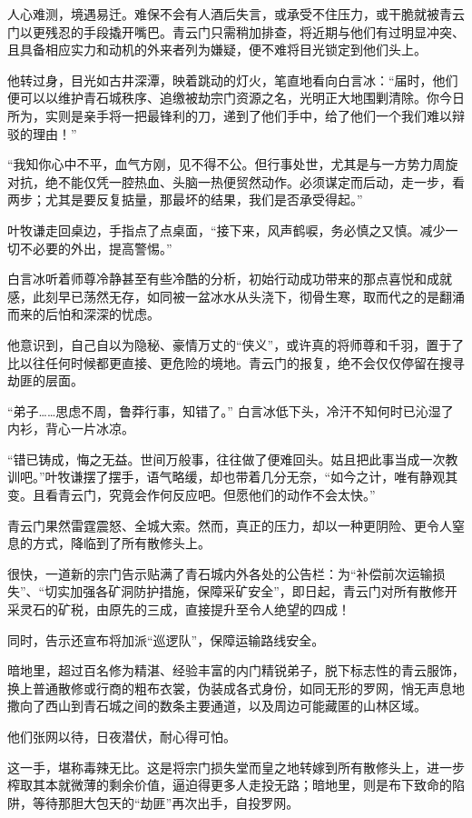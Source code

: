 人心难测，境遇易迁。难保不会有人酒后失言，或承受不住压力，或干脆就被青云门以更残忍的手段撬开嘴巴。青云门只需稍加排查，将近期与他们有过明显冲突、且具备相应实力和动机的外来者列为嫌疑，便不难将目光锁定到他们头上。

他转过身，目光如古井深潭，映着跳动的灯火，笔直地看向白言冰：“届时，他们便可以以维护青石城秩序、追缴被劫宗门资源之名，光明正大地围剿清除。你今日所为，实则是亲手将一把最锋利的刀，递到了他们手中，给了他们一个我们难以辩驳的理由！”

“我知你心中不平，血气方刚，见不得不公。但行事处世，尤其是与一方势力周旋对抗，绝不能仅凭一腔热血、头脑一热便贸然动作。必须谋定而后动，走一步，看两步；尤其是要反复掂量，那最坏的结果，我们是否承受得起。”

叶牧谦走回桌边，手指点了点桌面，“接下来，风声鹤唳，务必慎之又慎。减少一切不必要的外出，提高警惕。”

白言冰听着师尊冷静甚至有些冷酷的分析，初始行动成功带来的那点喜悦和成就感，此刻早已荡然无存，如同被一盆冰水从头浇下，彻骨生寒，取而代之的是翻涌而来的后怕和深深的忧虑。

他意识到，自己自以为隐秘、豪情万丈的“侠义”，或许真的将师尊和千羽，置于了比以往任何时候都更直接、更危险的境地。青云门的报复，绝不会仅仅停留在搜寻劫匪的层面。

“弟子……思虑不周，鲁莽行事，知错了。” 白言冰低下头，冷汗不知何时已沁湿了内衫，背心一片冰凉。

“错已铸成，悔之无益。世间万般事，往往做了便难回头。姑且把此事当成一次教训吧。”叶牧谦摆了摆手，语气略缓，却也带着几分无奈，“如今之计，唯有静观其变。且看青云门，究竟会作何反应吧。但愿他们的动作不会太快。”

\vspace{2em}

青云门果然雷霆震怒、全城大索。然而，真正的压力，却以一种更阴险、更令人窒息的方式，降临到了所有散修头上。

很快，一道新的宗门告示贴满了青石城内外各处的公告栏：为“补偿前次运输损失”、“切实加强各矿洞防护措施，保障采矿安全”，即日起，青云门对所有散修开采灵石的矿税，由原先的三成，直接提升至令人绝望的四成！

同时，告示还宣布将加派“巡逻队”，保障运输路线安全。

暗地里，超过百名修为精湛、经验丰富的内门精锐弟子，脱下标志性的青云服饰，换上普通散修或行商的粗布衣裳，伪装成各式身份，如同无形的罗网，悄无声息地撒向了西山到青石城之间的数条主要通道，以及周边可能藏匿的山林区域。

他们张网以待，日夜潜伏，耐心得可怕。

这一手，堪称毒辣无比。这是将宗门损失堂而皇之地转嫁到所有散修头上，进一步榨取其本就微薄的剩余价值，逼迫得更多人走投无路；暗地里，则是布下致命的陷阱，等待那胆大包天的“劫匪”再次出手，自投罗网。

